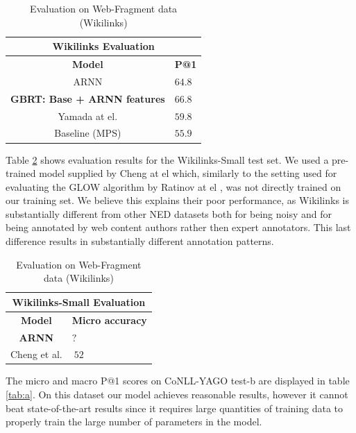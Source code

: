 \documentclass[11pt]{article}
\begin{document}
\begin{table}[h]
	\begin{center}
		\begin{tabular}{|c| p{1.5cm}|}
			\hline \multicolumn{2}{|c|}{Wikilinks Evaluation} \\
			\hline \bf Model & \bf P@1  \\ \hline
			ARNN  &                              $64.8$ \\
			\bf GBRT: Base + ARNN features & \bf $66.8$ \\
			Yamada at el. &                      $59.8$ \\
			Baseline (MPS) &                     $55.9$ \\
			\hline
		\end{tabular}
	\end{center}
	\caption{\label{tab:wikilink} Evaluation on Web-Fragment data (Wikilinks)}
\end{table}

Table \ref{tab:wikilinks-small} shows evaluation results for the Wikilinks-Small test set. We used a pre-trained model supplied by Cheng at el which, similarly to the setting used for evaluating the GLOW algorithm by Ratinov at el \cite{ratinov2011glow}, was not directly trained on our training set. We believe this explains their poor performance, as Wikilinks is substantially different from other NED datasets both for being noisy and for being annotated by web content authors rather then expert annotators. This last difference results in substantially different annotation patterns.

\begin{table}[h]
	\begin{center}
		\begin{tabular}{|c| p{1.5cm}|}
			\hline \multicolumn{2}{|c|}{Wikilinks-Small Evaluation} \\
			\hline \bf Model & \bf Micro     accuracy  \\ \hline
			\bf ARNN  &  \bf $?$ \\
			Cheng et al. & $~52$ \\
			\hline
		\end{tabular}
	\end{center}
	\caption{\label{tab:wikilinks-small} Evaluation on Web-Fragment data (Wikilinks)}
\end{table}

The micro and macro P@1 scores on CoNLL-YAGO test-b are displayed in table \ref{tab:a}. On this dataset our model achieves reasonable results, however it cannot beat state-of-the-art results since it requires large quantities of training data to properly train the large number of parameters in the model. 
\end{document}
